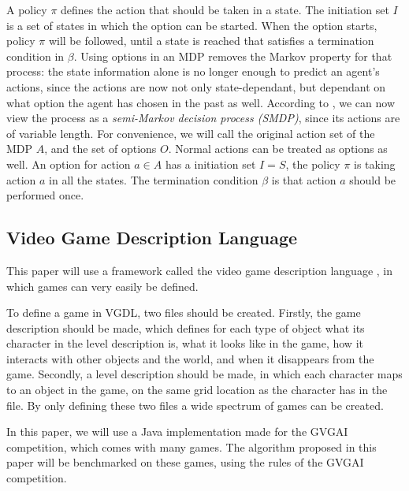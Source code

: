 A policy $\pi$ defines the action that should be taken in a state. The
initiation set $I$ is a set of states in which the option can be started. When the
option starts, policy $\pi$ will be followed, until a state is reached that
satisfies a termination condition in $\beta$. Using options in an MDP removes
the Markov property for that process: the state information alone is no longer
enough to predict an agent's actions, since the actions are now not only
state-dependant, but dependant on what option the agent has chosen in the past
as well. According to \cite{sutton1999between}, we can now view the process as a
\emph{semi-Markov decision process (SMDP)}, since its actions are of variable
length. For convenience, we will call the original action set of the MDP $A$,
and the set of options $O$.  Normal actions can be treated as options as well.
An option for action $a \in A$ has a initiation set $I = S$, the policy $\pi$ is
taking action $a$ in all the states. The termination condition $\beta$ is that
action $a$ should be performed once.

\subsection{Video Game Description Language}
\label{subsec:vgdl}
This paper will use a framework called the video game description
language \cite{schaul2013video}, in which games can very easily be defined.

To define a game in VGDL, two files should be created. Firstly, the game
description should be made, which defines for each type of object what its
character in the level description is, what it looks like in the game, how it
interacts with other objects and the world, and when it disappears from the
game. Secondly, a level description should be made, in which each character maps
to an object in the game, on the same grid location as the character has in the
file. By only defining these two files a wide spectrum of games can be created.

In this paper, we will use a Java implementation made for the GVGAI competition,
which comes with many games. The algorithm proposed in this paper will be
benchmarked on these games, using the rules of the GVGAI competition.
